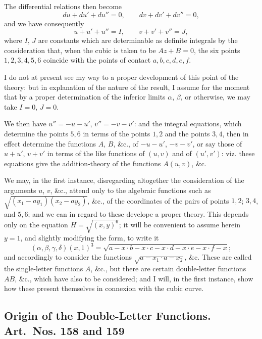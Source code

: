 \documentclass[11pt,a4paper]{book}
\begin{document}
\begin{art}
The differential relations then become
\[
du + du' + du'' = 0, \qquad dv + dv' + dv'' = 0,
\]
and we have consequently
\[
u + u' + u'' = I, \qquad v + v' + v'' = J,
\]
where $I$, $J$ are constants which are determinable as definite integrals by the consideration that, when the cubic is taken to be $Az + B = 0$, the six points $1,2,3,4,5,6$ coincide with the points of contact $a,b,c,d,e,f$.

I do not at present see my way to a proper development of this point of the theory: but in explanation of the nature of the result, I assume for the moment that by a proper determination of the inferior limits $\alpha$, $\beta$, or otherwise, we may take $I=0$, $J=0$.

We then have $u'' = -u - u'$, $v'' = -v - v'$: and the integral equations, which determine the points $5,6$ in terms of the points $1,2$ and the points $3,4$, then in effect determine the functions $A$, $B$, \&c., of $-u-u'$, $-v-v'$, or say those of $u+u'$, $v+v'$ in terms of the like functions of $(u,v)$ and of $(u',v')$: viz. these equations give the addition-theory of the functions $A(u,v)$, \&c.
\end{art}

\begin{art}
We may, in the first instance, disregarding altogether the consideration of the arguments $u$, $v$, \&c., attend only to the algebraic functions such as $\sqrt{(x_1-ay_1)(x_2-ay_2)}$, \&c., of the coordinates of the pairs of points $1,2$; $3,4$, and $5,6$; and we can in regard to these develope a proper theory. This depends only on the equation $H = \sqrt{(x,y)^6}$; it will be convenient to assume herein $y=1$, and slightly modifying the form, to write it
\[
(\alpha,\beta,\gamma,\delta)(x,1)^3 = \sqrt{a-x \cdot b-x \cdot c-x \cdot d-x \cdot e-x \cdot f-x};
\]
and accordingly to consider the functions $\sqrt{a-x_1 \cdot a-x_2}$, \&c. These are called the single-letter functions $A$, \&c., but there are certain double-letter functions $AB$, \&c., which have also to be considered; and I will, in the first instance, show how these present themselves in connexion with the cubic curve.
\end{art}

\subsection*{Origin of the Double-Letter Functions. Art.~Nos. 158 and 159}
\end{document}
